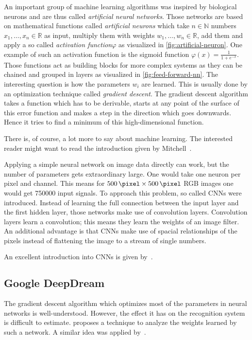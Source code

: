 \documentclass[technote,a4paper,leqno]{IEEEtran}
\begin{document}
An important group of machine learning algorithms was inspired by biological
neurons and are thus called \textit{artificial neural networks}. Those networks
are based on mathematical functions called \textit{artificial neurons} which
take $n \in \mathbb{N}$ numbers $x_1, \dots, x_n \in \mathbb{R}$ as input,
multiply them with weights $w_1, \dots, w_n \in \mathbb{R}$, add them and apply
a so called \textit{activation function}$\varphi$ as visualized in
\cref{fig:artificial-neuron}. One example of such an activation function is the
sigmoid function $\varphi(x) = \frac{1}{1+e^{-x}}$. Those functions act as
building blocks for more complex systems as they can be chained and grouped in
layers as visualized in \cref{fig:feed-forward-nn}. The interesting question is
how the parameters $w_i$ are learned. This is usually done by an optimization
technique called
\textit{gradient descent}. The gradient descent algorithm takes a function
which has to be derivable, starts at any point of the surface of this error
function and makes a step in the direction which goes downwards. Hence it tries
to find a minimum of this high-dimensional function.

There is, of course, a lot more to say about machine learning. The interested
reader might want to read the introduction given by Mitchell~\cite{Mitchell97}.

Applying a simple neural network on image data directly can work, but the number
of parameters gets extraordinary large. One would take one neuron per pixel and
channel. This means for $\SI{500}{\pixel} \times \SI{500}{\pixel}$ RGB images
one would get \num{750000} input signals. To approach this problem, so called
\glspl{CNN} were introduced. Instead of learning the full connection between
the input layer and the first hidden layer, those networks make use of
convolution layers. Convolution layers learn a convolution; this means they
learn the weights of an image filter. An additional advantage is that
\glspl{CNN} make use of spacial relationships of the pixels instead of
flattening the image to a stream of single numbers.

An excellent introduction into \glspl{CNN} is given by~\cite{Nielsen2015}.

\subsection{Google DeepDream}\label{subsec:google-deepdream}%
The gradient descent algorithm which optimizes most of the parameters in neural
networks is well-understood. However, the effect it has on the recognition
system is difficult to estimate. \cite{inceptionism2015} proposes a technique
to analyze the weights learned by such a network. A similar idea was applied
by~\cite{vondrick2013hoggles}.
\end{document}
